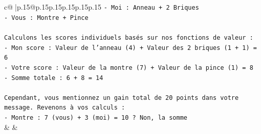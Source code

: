 \documentclass{article}
\begin{document}
{\begin{supertabular}{c@{$\;$}|p{.15\linewidth}@{}p{.15\linewidth}p{.15\linewidth}p{.15\linewidth}p{.15\linewidth}p{.15\linewidth}}
{{{\texttt{{-} Moi : Anneau + 2 Briques} \\
\texttt{{-} Vous : Montre + Pince} \\
\\ 
\texttt{Calculons les scores individuels basés sur nos fonctions de valeur :} \\
\texttt{{-} Mon score : Valeur de l'anneau (4) + Valeur des 2 briques (1 + 1) = 6} \\
\texttt{{-} Votre score : Valeur de la montre (7) + Valeur de la pince (1) = 8} \\
\texttt{{-} Somme totale : 6 + 8 = 14} \\
\\ 
\texttt{Cependant, vous mentionnez un gain total de 20 points dans votre message. Revenons à vos calculs :} \\
\texttt{{-} Montre : 7 (vous) + 3 (moi) = 10 ? Non, la somme} \\
            }
        }
    }
    & & \\ \\


\end{supertabular}}
\end{document}
